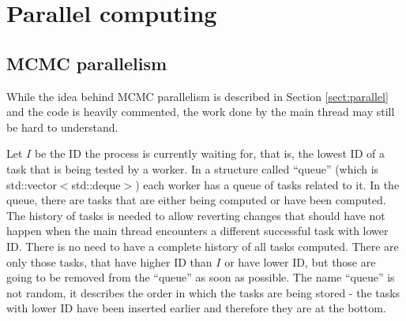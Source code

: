 \section{Parallel computing}

\subsection{MCMC parallelism}
While the idea behind MCMC parallelism is described in Section \ref{sect:parallel} and the code is heavily commented, the work done by the main thread may still be hard to understand.

Let $I$ be the ID the process is currently waiting for, that is, the lowest ID of a task that is being tested by a worker. In a structure called ``queue'' (which is std::vector$<$std::deque$>$) each worker has a queue of tasks related to it. In the queue, there are tasks that are either being computed or have been computed. The history of tasks is needed to allow reverting changes that should have not happen when the main thread encounters a different successful task with lower ID. There is no need to have a complete history of all tasks computed. There are only those tasks, that have higher ID than $I$ or have lower ID, but those are going to be removed from the ``queue'' as soon as possible. The name ``queue'' is not random, it describes the order in which the tasks are being stored - the tasks with lower ID have been inserted earlier and therefore they are at the bottom.

